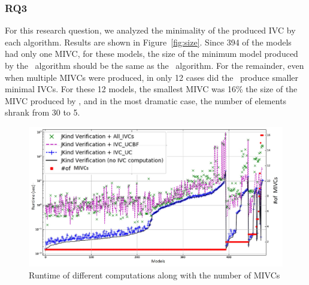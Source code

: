 \subsubsection{RQ3}
For this research question, we analyzed the minimality of the produced IVC by each algorithm.  Results are shown in Figure~\ref{fig:size}.  Since 394 of the models had only one MIVC, for these models, the size of the minimum model produced by the \aivcalg\ algorithm should be the same as the \ucbfalg\ algorithm.  For the remainder, even when multiple MIVCs were produced, in only 12 cases did the \aivcalg\ produce smaller minimal IVCs.  For these 12 models, the smallest MIVC was 16\% the size of the MIVC produced by \ucbfalg, and in the most dramatic case, the number of elements shrank from 30 to 5. %





 \begin{figure}
 \centering
  \includegraphics[width=\columnwidth]{figs/size.jpg}
  \vspace{-0.25in}
  \caption{Runtime of different computations along with the number of MIVCs}
  \vspace{-0.2in}
  \label{fig:modelsize}
\end{figure}

